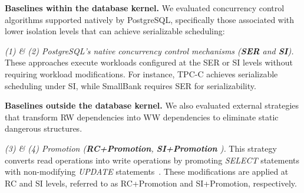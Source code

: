 \noindent\textbf{Baselines within the database kernel.} 
We evaluated concurrency control algorithms supported natively by PostgreSQL, specifically those associated with lower isolation levels that can achieve serializable scheduling: 

\textit{(1) \& (2) PostgreSQL’s native concurrency control mechanisms (\textbf{SER} and \textbf{SI}).}  
These approaches execute workloads configured at the SER or SI levels without requiring workload modifications. For instance, TPC-C achieves serializable scheduling under SI, while SmallBank requires SER for serializability. 



\noindent\textbf{Baselines outside the database kernel.} We also evaluated external strategies that transform RW dependencies into WW dependencies to eliminate static dangerous structures.  


\textit{(3) \& (4) Promotion (\textbf{RC+Promotion}\cite{DBLP:conf/icdt/VandevoortK0N22}, \textbf{SI+Promotion} \cite{DBLP:conf/icde/AlomariCFR08}).} 
This strategy converts read operations into write operations by promoting \textit{SELECT} statements with non-modifying \textit{UPDATE} statements~\cite{DBLP:conf/icde/AlomariCFR08}. These modifications are applied at RC and SI levels, referred to as RC+Promotion and SI+Promotion, respectively.  

